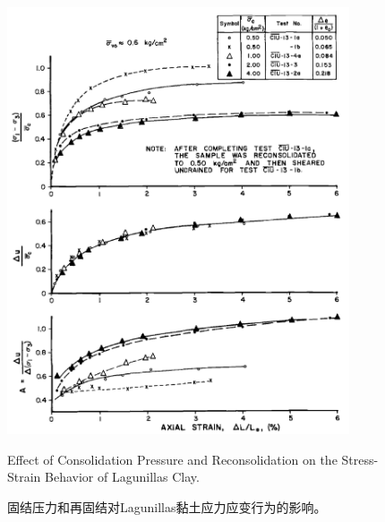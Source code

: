 \begin{figure}[!htbp]
    \centering
    \begin{minipage}[t]{0.48\textwidth}
        \centering
        \includegraphics[width=0.9\textwidth]{figures/figure-13.png}
        \caption{Effect of Consolidation Pressure and Reconsolidation on the Stress-Strain Behavior of Lagunillas Clay.}
        \vspace{-5pt}
        \addtocounter{figure}{-1}
        \renewcommand{\figurename}{图}
        \caption{固结压力和再固结对Lagunillas黏土应力应变行为的影响。}
        \label{figure:13}
        \renewcommand{\figurename}{Figure}
    \end{minipage}
    \begin{minipage}[t]{0.48\textwidth}
        \centering

\end{minipage}
\end{figure}
